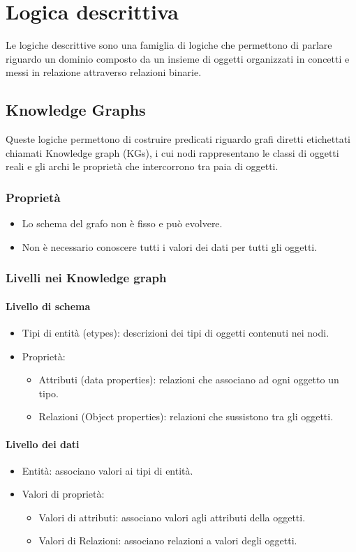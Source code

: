 \chapter{Logica descrittiva}
Le logiche descrittive sono una famiglia di logiche che permettono di parlare riguardo un dominio composto da un insieme di oggetti organizzati in concetti e messi in relazione attraverso relazioni binarie. 
\section{Knowledge Graphs}
Queste logiche permettono di costruire predicati riguardo grafi diretti etichettati chiamati Knowledge graph (KGs), i cui nodi rappresentano le classi di oggetti reali e gli archi le propriet\`a che intercorrono tra paia 
di oggetti.
\subsection{Propriet\`a}
\begin{itemize}
\item Lo schema del grafo non \`e fisso e pu\`o evolvere.
\item Non \`e necessario conoscere tutti i valori dei dati per tutti gli oggetti.
\end{itemize}
\subsection{Livelli nei Knowledge graph}
\subsubsection{Livello di schema}
\begin{itemize}
\item Tipi di entit\`a (etypes): descrizioni dei tipi di oggetti contenuti nei nodi.
\item Propriet\`a:
\begin{itemize}
\item Attributi (data properties): relazioni che associano ad ogni oggetto un tipo.
\item Relazioni (Object properties): relazioni che sussistono tra gli oggetti.
\end{itemize}
\end{itemize}
\subsubsection{Livello dei dati}
\begin{itemize}
\item Entit\`a: associano valori ai tipi di entit\`a.
\item Valori di propriet\`a:
\begin{itemize}
\item Valori di attributi: associano valori agli attributi della oggetti.
\item Valori di Relazioni: associano relazioni a valori degli oggetti.
\end{itemize}
\end{itemize}
